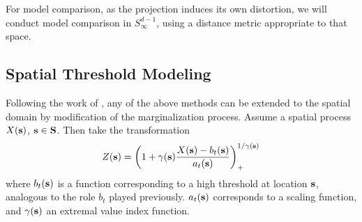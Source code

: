 For model comparison, as the projection induces its own distortion, we will
  conduct model comparison in $S_{\infty}^{d-1}$, using a distance metric
  appropriate to that space.


















\subsection{Spatial Threshold Modeling}
Following the work of \cite{ferreira2014}, any of the above methods can be
  extended to the spatial domain by modification of the marginalization process.
  Assume a spatial process $X({\bf s})$, ${\bf s}\in {\bf S}$.  Then take the
  transformation
\begin{equation}
  \label{eqn:spatial}
  Z({\bf s}) = \left(1 + \gamma({\bf s})\frac{X({\bf s}) - b_t({\bf s})}{a_t({\bf s})}\right)_{+}^{1/{\gamma({\bf s})}}
\end{equation}
  where $b_t({\bf s})$ is a function corresponding to a high threshold at location
  ${\bf s}$, analogous to the role $b_t$ played previously. $a_t({\bf s})$
  corresponds to a scaling function, and $\gamma({\bf s})$ an extremal value index
  function.







